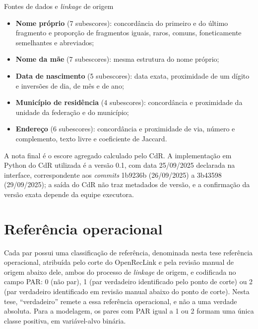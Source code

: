 \begin{chapter}{Fontes de dados e \textit{linkage} de origem}
\begin{itemize}
\item \textbf{Nome próprio} (7 subescores): concordância do primeiro e do último fragmento e proporção de fragmentos iguais, raros, comuns, foneticamente semelhantes e abreviados;
\item \textbf{Nome da mãe} (7 subescores): mesma estrutura do nome próprio;
\item \textbf{Data de nascimento} (5 subescores): data exata, proximidade de um dígito e inversões de dia, de mês e de ano;
\item \textbf{Município de residência} (4 subescores): concordância e proximidade da unidade da federação e do município;
\item \textbf{Endereço} (6 subescores): concordância e proximidade de via, número e complemento, texto livre e coeficiente de Jaccard.
\end{itemize}

A nota final é o escore agregado calculado pelo CdR. A implementação em Python do CdR utilizada é a versão 0.1, com data 25/09/2025 declarada na interface, correspondente aos \textit{commits} 1b9236b (26/09/2025) a 3b43598 (29/09/2025); a saída do CdR não traz metadados de versão, e a confirmação da versão exata depende da equipe executora.

\section{Referência operacional}\label{sec:padrao-ouro}

Cada par possui uma classificação de referência, denominada nesta tese referência operacional, atribuída pelo corte do OpenRecLink e pela revisão manual de origem abaixo dele, ambos do processo de \textit{linkage} de origem, e codificada no campo PAR: 0 (não par), 1 (par verdadeiro identificado pelo ponto de corte) ou 2 (par verdadeiro identificado em revisão manual abaixo do ponto de corte). Nesta tese, ``verdadeiro'' remete a essa referência operacional, e não a uma verdade absoluta. Para a modelagem, os pares com PAR igual a 1 ou 2 formam uma única classe positiva, em variável-alvo binária.


\end{chapter}
